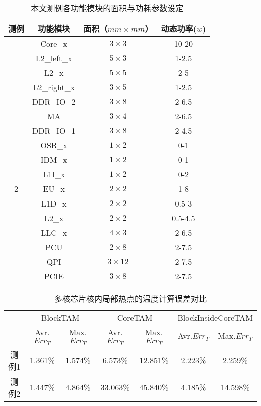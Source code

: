 \begin{table}
\centering
\caption{本文测例各功能模块的面积与功耗参数设定}
\begin{tabular}{c c c c}
\hline\hline
测例 & 功能模块 & 面积（$mm \times mm$） & 动态功率($w$) \\
\hline
 & Core\_x & $3\times 3$ & 10-20 \\

 & L2\_left\_x & $5\times 3$ & 1-2.5 \\
\raisebox{1.5ex}{1}
 & L2\_x & $5\times 5$ & 2-5 \\
 & L2\_right\_x & $3\times 5$ & 1-2.5 \\
\hline
 & DDR\_IO\_2 & $3 \times 8$ & 2-6.5 \\
 & MA & $3 \times 4$ & 2-6.5 \\
 & DDR\_IO\_1 & $3 \times 8$ & 2-4.5 \\
 & OSR\_x & $1 \times 2$ & 0-1 \\
 & IDM\_x & $1 \times 2$ & 0-1 \\
 & L1I\_x & $1 \times 2$ & 0-2 \\
2 & EU\_x & $2 \times 2$ & 1-8 \\
 & L1D\_x & $2 \times 2$ & 0.5-3 \\
 & L2\_x & $2 \times 2$ & 0.5-4.5 \\
 & LLC\_x & $4 \times 3$ & 2-6.5 \\
 & PCU & $2 \times 8$ & 2-7.5 \\
 & QPI & $3 \times 12$ & 2-7.5 \\
 & PCIE & $3 \times 8$ & 2-7.5 \\
\hline
\end{tabular}
\label{tab:chap5:exp-flp-parameters}
\end{table}


\begin{table}
\centering
\caption{多核芯片核内局部热点的温度计算误差对比}
\begin{tabular}{c c c c c c c}
\hline\hline
 & \multicolumn{2}{c}{BlockTAM} & \multicolumn{2}{c}{CoreTAM} & \multicolumn{2}{c}{BlockInsideCoreTAM} \\
 & Avr.$Err_T$ & Max.$Err_T$ & Avr.$Err_T$ & Max.$Err_T$ & Avr.$Err_T$ & Max.$Err_T$ \\
 \hline
测例1 & 1.361\% & 1.574\% & 6.573\% & 12.851\% & 2.223\% & 2.259\% \\
\hline
测例2 & 1.447\% & 4.864\% & 33.063\% & 45.840\% & 4.185\% & 14.598\% \\
\hline
\end{tabular}
\label{tab:chap5:temp-error}
\end{table}

